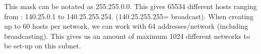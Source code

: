 This mask can be notated as 255.255.0.0. This gives 65534 different hosts ranging from : 140.25.0.1 to 140.25.255.254. (140.25.255.255= broadcast).
When creating up to 60 hosts per network, we can work with 64 addresses/network (including broadcasting).
This gives us an amount of maximum 1024 different networks to be set-up on this subnet.